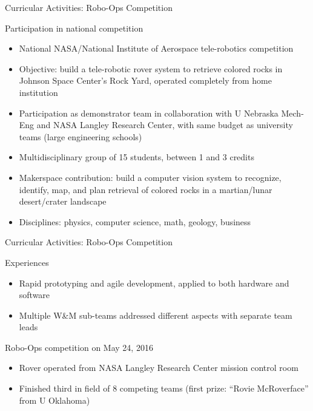 \documentclass[xcolor=table,compress,professionalfonts,pdfpagelabels]{beamer}
\begin{document}
\begin{frame}{Curricular Activities: Robo-Ops Competition}
 \begin{block}{Participation in national competition}
  \begin{itemize}
   \item National NASA/National Institute of Aerospace tele-robotics competition
   \item Objective: build a tele-robotic rover system to retrieve colored rocks in Johnson Space Center's Rock Yard, operated completely from home institution
   \item Participation as demonstrator team in collaboration with U Nebraska Mech-Eng and NASA Langley Research Center, with same budget as university teams (large engineering schools)
   \item Multidisciplinary group of 15 students, between 1 and 3 credits
   \item Makerspace contribution: build a computer vision system to recognize, identify, map, and plan retrieval of colored rocks in a martian/lunar desert/crater landscape
   \item Disciplines: physics, computer science, math, geology, business
  \end{itemize}
 \end{block}
\end{frame}

\begin{frame}{Curricular Activities: Robo-Ops Competition}
 \begin{block}{Experiences}
  \begin{itemize}
   \item Rapid prototyping and agile development, applied to both hardware and software
   \item Multiple W\&M sub-teams addressed different aspects with separate team leads
  \end{itemize}
 \end{block}
 \begin{block}{Robo-Ops competition on May 24, 2016}
  \begin{itemize}
   \item Rover operated from NASA Langley Research Center mission control room
   \item Finished third in field of 8 competing teams (first prize: ``Rovie McRoverface'' from U Oklahoma)
  \end{itemize}
 \end{block}
\end{frame}
\end{document}
